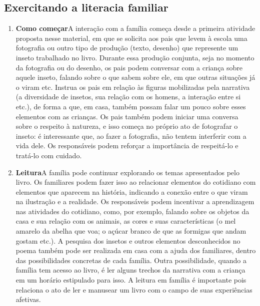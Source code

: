\documentclass[11pt]{extarticle}
\begin{document}
\subsection{Exercitando a literacia familiar}





\begin{enumerate}
\item \textbf{Como começar}\quad A interação com a família começa desde a primeira atividade proposta nesse material, em que se solicita aos pais que levem à escola uma fotografia ou outro tipo de produção (texto, desenho) que represente um inseto trabalhado no livro.
Durante essa produção conjunta, seja no momento da fotografia ou do desenho, os pais podem conversar com a criança sobre aquele inseto, falando sobre o que sabem sobre ele, em que outras situações já o viram etc.
Instrua os pais em relação às figuras mobilizadas pela narrativa (a diversidade de insetos, sua relação com os homens, a interação entre si etc.), de forma a que, em casa, também possam falar um pouco sobre esses elementos com as crianças.
Os pais também podem iniciar uma conversa sobre o respeito à natureza, e isso começa no próprio ato de fotografar o inseto: é interessante que, ao fazer a fotografia, não tentem interferir com a vida dele. Os responsáveis podem reforçar a importância de respeitá-lo e tratá-lo com cuidado.

\item \textbf{Leitura}\quad A família pode continuar 
explorando os temas apresentados pelo livro. Os familiares podem fazer isso ao relacionar 
elementos do cotidiano com elementos que aparecem na história, indicando a conexão 
entre o que viram na ilustração e a realidade. Os responsáveis podem incentivar a aprendizagem nas atividades do cotidiano, como, por exemplo, falando sobre os objetos da casa e sua relação com os animais, as cores e suas características (o mel amarelo da abelha que voa; o açúcar branco de que as formigas que andam gostam etc.). A pesquisa dos insetos e outros elementos desconhecidos no poema também pode ser realizada em casa com a ajuda dos familiares, dentro das possibilidades concretas de cada família. Outra possibilidade, quando a família tem acesso ao livro, é ler alguns trechos da narrativa com a criança em um horário estipulado para isso. A leitura em família é importante pois relaciona o ato de ler e manusear um livro com o campo de suas experiências afetivas.


\end{enumerate}
\end{document}
